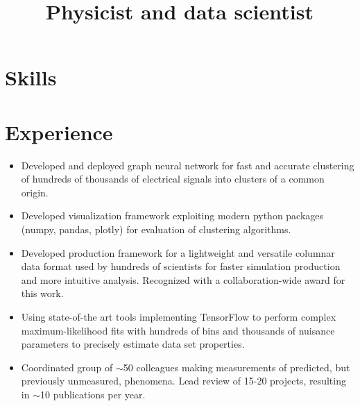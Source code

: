 \documentclass[9pt,a4paper]{moderncv}
\title{Physicist and data scientist}               %
\begin{document}
\maketitle


\vspace{-1cm}
\section{Skills}


\section{Experience}
{
\begin{itemize}
    \item Developed and deployed graph neural network for fast and accurate clustering of hundreds of thousands of electrical signals into clusters of a common origin. 
    \item Developed visualization framework exploiting modern python packages (numpy, pandas, plotly) for evaluation of clustering algorithms.
    \item Developed production framework for a lightweight and versatile columnar data format used by hundreds of scientists for faster simulation production and more intuitive analysis. Recognized with a collaboration-wide award for this work.
    \item Using state-of-the art tools implementing TensorFlow to perform complex maximum-likelihood fits with hundreds of bins and thousands of nuisance parameters to precisely estimate data set properties.
    \item Coordinated group of $\sim$50 colleagues making measurements of predicted, but previously unmeasured, phenomena. Lead review of 15-20 projects, resulting in $\sim$10 publications per year.
\end{itemize}
}
\end{document}
